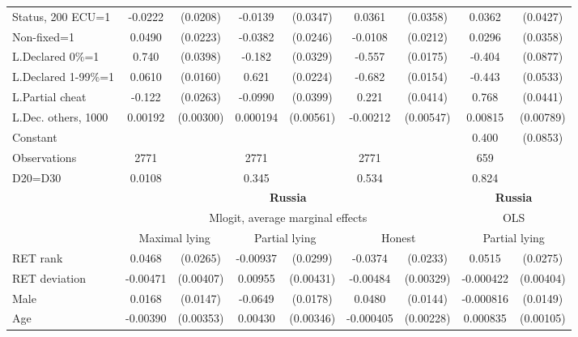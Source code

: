 \begin{tabular}{l|cccccc|cc}
Status, 200 ECU=1&  -0.0222         & (0.0208)&  -0.0139         & (0.0347)&   0.0361         & (0.0358)&   0.0362         & (0.0427)\\
Non-fixed=1     &   0.0490\sym{**} & (0.0223)&  -0.0382         & (0.0246)&  -0.0108         & (0.0212)&   0.0296         & (0.0358)\\
L.Declared 0\%=1&    0.740\sym{***}& (0.0398)&   -0.182\sym{***}& (0.0329)&   -0.557\sym{***}& (0.0175)&   -0.404\sym{***}& (0.0877)\\
L.Declared 1-99\%=1&   0.0610\sym{***}& (0.0160)&    0.621\sym{***}& (0.0224)&   -0.682\sym{***}& (0.0154)&   -0.443\sym{***}& (0.0533)\\
L.Partial cheat &   -0.122\sym{***}& (0.0263)&  -0.0990\sym{**} & (0.0399)&    0.221\sym{***}& (0.0414)&    0.768\sym{***}& (0.0441)\\
L.Dec. others, 1000&  0.00192         &(0.00300)& 0.000194         &(0.00561)& -0.00212         &(0.00547)&  0.00815         &(0.00789)\\
Constant        &                  &         &                  &         &                  &         &    0.400\sym{***}& (0.0853)\\
\hline
Observations    &     2771         &         &     2771         &         &     2771         &         &      659         &         \\
D20=D30         &   0.0108         &         &    0.345         &         &    0.534         &         &    0.824         &         \\
\hline\hline
&\multicolumn{6}{c|}{\bf Russia}&\multicolumn{2}{c}{\bf Russia}\\ &\multicolumn{6}{c|}{Mlogit, average marginal effects }&\multicolumn{2}{c}{OLS}\\
                &\multicolumn{2}{c}{Maximal lying}&\multicolumn{2}{c}{Partial lying}&\multicolumn{2}{c}{Honest}  &\multicolumn{2}{c}{Partial lying}\\
\hline
RET rank        &   0.0468\sym{*}  & (0.0265)& -0.00937         & (0.0299)&  -0.0374         & (0.0233)&   0.0515\sym{*}  & (0.0275)\\
RET deviation   & -0.00471         &(0.00407)&  0.00955\sym{**} &(0.00431)& -0.00484         &(0.00329)&-0.000422         &(0.00404)\\
Male            &   0.0168         & (0.0147)&  -0.0649\sym{***}& (0.0178)&   0.0480\sym{***}& (0.0144)&-0.000816         & (0.0149)\\
Age             & -0.00390         &(0.00353)&  0.00430         &(0.00346)&-0.000405         &(0.00228)& 0.000835         &(0.00105)\\

\end{tabular}

